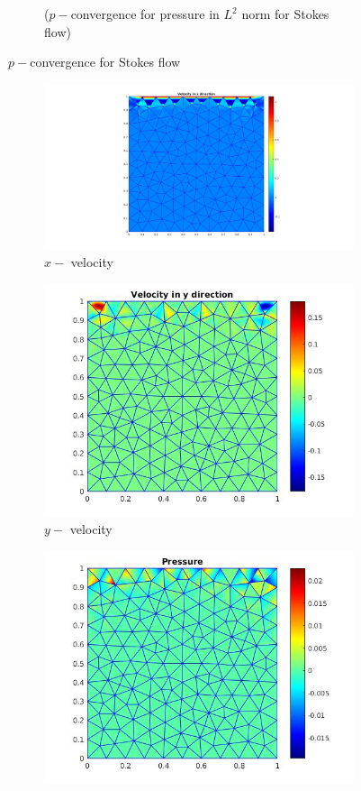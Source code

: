 \documentclass[a4paper,openany]{book}
\begin{document}
\begin{figure}
\begin{subfigure}{\textwidth}
  \caption{($p-$convergence for pressure in $L^2$ norm for Stokes flow)}
  \label{p_convergence_pressure_l2}
\end{subfigure}
\caption{$p-$convergence for Stokes flow}
\label{p_conv_stokes_flow}
\end{figure}

\begin{figure}
\begin{subfigure}{\textwidth}	
  \includegraphics[width=0.8\linewidth]{lid_bicgstab_vx.jpg}
  \caption{$x-$ velocity} 
  \label{x_vel_stoke_bicgstab_lid}
\end{subfigure}
\begin{subfigure}{\textwidth}	
  \includegraphics[width=0.8\linewidth]{lid_bicgstab_vy.jpg}
  \caption{$y-$ velocity} 
  \label{y_vel_stoke_bicgstab_lid}
\end{subfigure}
\begin{subfigure}{\textwidth}	
  \includegraphics[width=0.8\linewidth]{lid_bicgstab_pressure.jpg}

\end{subfigure}
\end{figure}
\end{document}
